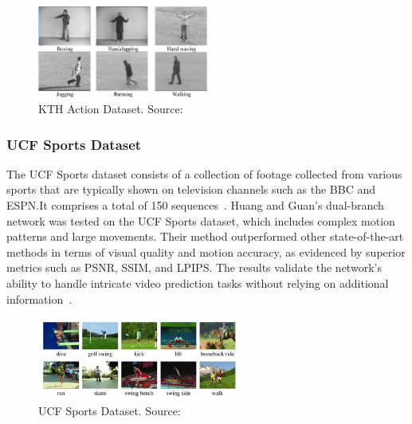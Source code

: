 \documentclass[12pt,oneside]{book} %
\begin{document}
\begin{figure}[H]
    \centering
    \includegraphics[width=0.5\textwidth]{figures/KTH-dataset.png}
    \caption{KTH Action Dataset. Source:~\citet{KTH}}\label{fig:kth-action-dataset}
\end{figure}

\subsubsection*{UCF Sports Dataset}

The UCF Sports dataset consists of a collection of footage collected from
various sports that are typically shown on television channels such as the BBC
and ESPN.\@ It comprises a total of 150 sequences~\cite{UCFSport}. Huang and
Guan's dual-branch network was tested on the UCF Sports dataset, which includes
complex motion patterns and large movements. Their method outperformed other
state-of-the-art methods in terms of visual quality and motion accuracy, as
evidenced by superior metrics such as PSNR, SSIM, and LPIPS. The results
validate the network's ability to handle intricate video prediction tasks
without relying on additional information~\cite{
    DualBranchSpatialTemporalLearningNetworkVideoPrediction}.

\begin{figure}[H]
    \centering
    \includegraphics[width=0.6\textwidth]{figures/ucf-sport-dataset.png}
    \caption{UCF Sports Dataset. Source:~\citet{UCFSport}}\label{fig:ucf-sports-dataset}
\end{figure}

%



\end{document}
